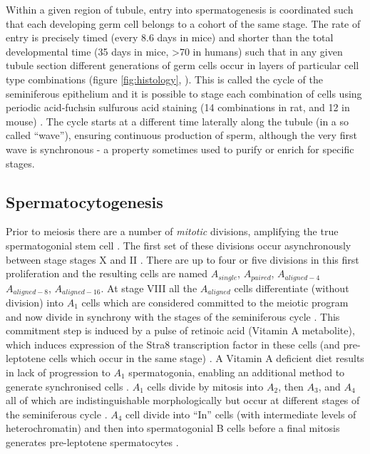Within a given region of tubule, entry into spermatogenesis is coordinated such that each developing germ cell belongs to a cohort of the same stage. The rate of entry is precisely timed (every 8.6 days in mice) and shorter than the total developmental time (35 days in mice, >70 in humans) such that in any given tubule section different generations of germ cells occur in layers of particular cell type combinations (figure \ref{fig:histology}, \cite{Oakberg1956Duration,Clermont1969Duration, Heller1969Human}). This is called the cycle of the seminiferous epithelium and it is possible to stage each combination of cells using periodic acid‐fuchsin sulfurous acid staining (14 combinations in rat, and 12 in mouse) \parencite{Leblond1952Spermiogenesis, Leblond1952Definition, Oakberg1956description}. The cycle starts at a different time laterally along the tubule (in a so called ``wave''), ensuring continuous production of sperm, although the very first wave is synchronous - a property sometimes used to purify or enrich for specific stages.

\subsection{Spermatocytogenesis}
Prior to meiosis there are a number of \emph{mitotic} divisions, amplifying the true spermatogonial stem cell \parencite{Oakberg1971Spermatogonial, Huckins1971spermatogonial}. The first set of these divisions occur asynchronously between stage stages X and II \parencite{Rooij2001Proliferation}. There are up to four or five divisions in this first proliferation and the resulting cells are named $A_{single}$, $A_{paired}$, $A_{aligned-4}$ $A_{aligned-8}$, $A_{aligned-16}$. At stage VIII all the $A_{aligned}$ cells differentiate (without division) into $A_1$ cells which are considered committed to the meiotic program and now divide in synchrony with the stages of the seminiferous cycle \parencite{Rooij2000All}. This commitment step is induced by a pulse of retinoic acid (Vitamin A metabolite), which induces expression of the Stra8 transcription factor in these cells (and pre-leptotene cells which occur in the same stage) \parencite{Griswold2012Initiating, Lin2008Germ, Zhou2008Expression, Hogarth2015Processive, Griswold2015Spermatogenesis}. A Vitamin A deficient diet results in lack of progression to $A_1$ spermatogonia, enabling an additional method to generate synchronised cells \parencite{Thompson1964Vitamin}. $A_1$ cells divide by mitosis into $A_2$, then $A_3$, and $A_4$ all of which are indistinguishable morphologically but occur at different stages of the seminiferous cycle \parencite{Rooij2000All}. $A_4$ cell divide into ``In'' cells (with intermediate levels of heterochromatin) and then into spermatogonial B cells before a final mitosis generates pre-leptotene spermatocytes \parencite{Rooij2000All}.

